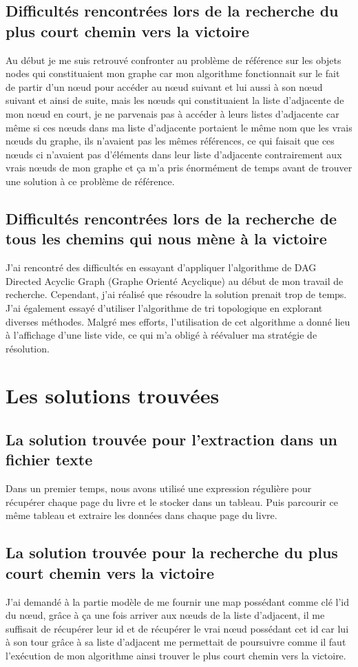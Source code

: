 \documentclass[12pt]{article}
\begin{document}
\subsection{Difficultés rencontrées lors de la recherche du plus court chemin vers la victoire}
Au début je me suis retrouvé confronter au problème de référence sur les objets nodes qui constituaient mon graphe car mon algorithme fonctionnait sur le fait de partir d'un nœud pour accéder au nœud suivant et lui aussi à son nœud suivant et ainsi de suite, mais les nœuds qui constituaient la liste d'adjacente de mon nœud en court, je ne parvenais pas à accéder à leurs listes d'adjacente car même si ces nœuds dans ma liste d'adjacente portaient le même nom que les vrais nœuds du graphe, ils n'avaient pas les mêmes références, ce qui faisait que ces nœuds ci n'avaient pas d’éléments dans leur liste d'adjacente contrairement aux vrais nœuds de mon graphe et ça m'a pris énormément de temps avant de trouver une solution à ce problème de référence.

\subsection{Difficultés rencontrées lors de la recherche de tous les chemins qui nous mène à la victoire}
J'ai rencontré des difficultés en essayant d'appliquer l'algorithme de DAG Directed Acyclic Graph (Graphe Orienté Acyclique) au début de mon travail de recherche. Cependant, j'ai réalisé que résoudre la solution prenait trop de temps.
J'ai également essayé d'utiliser l'algorithme de tri topologique en explorant diverses méthodes. Malgré mes efforts, l'utilisation de cet algorithme a donné lieu à l'affichage d'une liste vide, ce qui m'a obligé à réévaluer ma stratégie de résolution.

\section{Les solutions trouvées}
\subsection{La solution trouvée pour l'extraction dans un fichier texte}
Dans un premier temps, nous avons utilisé une expression régulière pour récupérer chaque page du
livre et le stocker dans un tableau. Puis parcourir ce même tableau et extraire les données dans 
chaque page du livre.

\subsection{La solution trouvée pour la recherche du plus court chemin vers la victoire}
J'ai demandé à la partie modèle de me fournir une map possédant comme clé l'id du nœud, grâce à ça une fois arriver aux nœuds de la liste d’adjacent, il me suffisait de récupérer leur id et de récupérer le vrai nœud possédant cet id car lui à son tour grâce à sa liste d'adjacent me permettait de poursuivre comme il faut l'exécution de mon algorithme ainsi trouver le plus court chemin vers la victoire.
\end{document}
